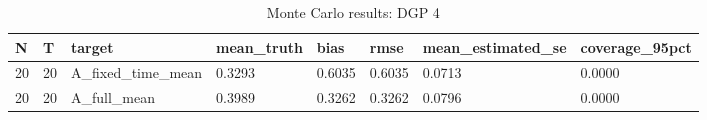 \begin{table}[!htbp]
\centering
\caption{Monte Carlo results: DGP 4}
\label{tab:mc-dgp4}
\begin{tabular}{llllllll}
\toprule
N & T & target & mean\_truth & bias & rmse & mean\_estimated\_se & coverage\_95pct \\
\midrule
20 & 20 & A\_fixed\_time\_mean & 0.3293 & 0.6035 & 0.6035 & 0.0713 & 0.0000 \\
20 & 20 & A\_full\_mean & 0.3989 & 0.3262 & 0.3262 & 0.0796 & 0.0000 \\
\bottomrule
\end{tabular}
\end{table}
